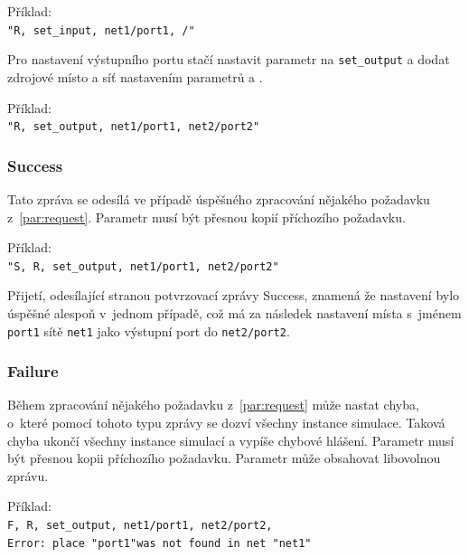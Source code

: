 \begin{tabbing}
  Příklad: \= \\
  \>\texttt{"R, set\_input, net1/port1, /"}
\end{tabbing}

Pro nastavení výstupního portu stačí nastavit parametr  na \texttt{set\_output} a dodat zdrojové místo a síť nastavením parametrů  a .

\begin{tabbing}
  Příklad: \= \\
  \> \texttt{"R, set\_output, net1/port1, net2/port2"} \\
\end{tabbing}

\subsubsection{Success} Tato zpráva se odesílá ve případě úspěšného zpracování nějakého požadavku z~\ref{par:request}. Parametr  musí být přesnou kopií příchozího požadavku.

\begin{tabbing}
  Příklad: \= \\
  \> \texttt{"S, R, set\_output, net1/port1, net2/port2"} \\
\end{tabbing}

Přijetí, odesílající stranou potvrzovací zprávy Success, znamená že nastavení bylo úspěšné alespoň v~jednom případě, což má za následek nastavení místa s~jménem \texttt{port1} sítě \texttt{net1} jako výstupní port do \texttt{net2/port2}.

\subsubsection{Failure} Během zpracování nějakého požadavku z~\ref{par:request} může nastat chyba, o~které pomocí tohoto typu zprávy se dozví všechny instance simulace. Taková chyba ukončí všechny instance simulací a vypíše chybové hlášení. Parametr  musí být přesnou kopii příchozího požadavku. Parametr  může obsahovat libovolnou zprávu.

\begin{tabbing}
  Příklad: \= \\
  \> \texttt{F, R, set\_output, net1/port1, net2/port2, }\\
  \> \texttt{Error: place "port1"\space was not found in net "net1"} \\
\end{tabbing}

